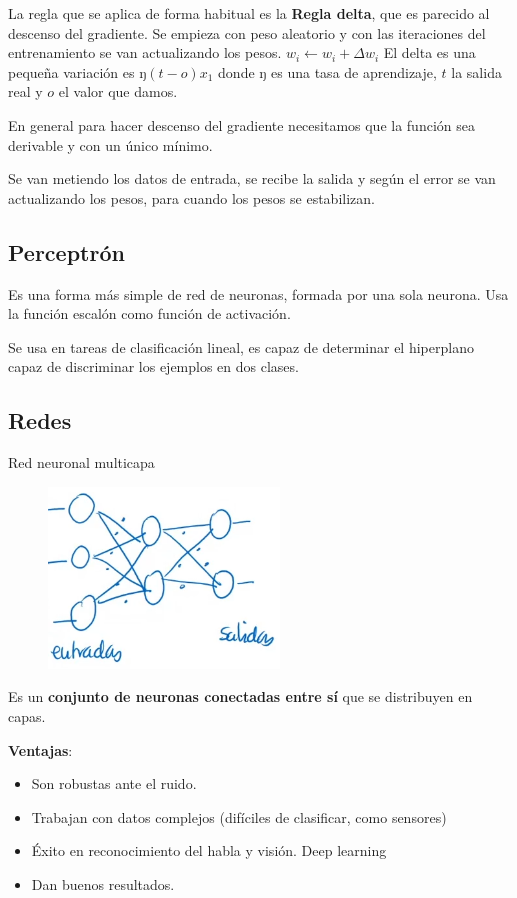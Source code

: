 \documentclass[12pt, twoside, openright]{report} %
\begin{document}
La regla que se aplica de forma habitual es la \textbf{Regla delta}, que
es parecido al descenso del gradiente. Se empieza con peso aleatorio y
con las iteraciones del entrenamiento se van actualizando los pesos.
\(w_i \leftarrow w_i+\Delta w_i\) El delta es una pequeña variación es
ŋ\((t-o)x_1\) donde ŋ es una tasa de aprendizaje, \(t\) la salida real y
\(o\) el valor que damos.

En general para hacer descenso del gradiente necesitamos que la función
sea derivable y con un único mínimo.

Se van metiendo los datos de entrada, se recibe la salida y según el error se van actualizando los pesos, para cuando los pesos se estabilizan.

\subsection{Perceptrón}

Es una forma más simple de red de neuronas, formada por una sola
neurona. Usa la función escalón como función de activación.

Se usa en tareas de clasificación lineal, es capaz de determinar el hiperplano capaz de discriminar los ejemplos en dos clases.

\subsection{Redes}

Red neuronal multicapa
\begin{figure}[H]
	{\includegraphics[scale=.82]{image-20210312102144206.png}}
\end{figure}
\vspace{-.5cm}
Es un \textbf{conjunto de neuronas conectadas entre sí} que se distribuyen en capas.

\textbf{Ventajas}:
\vspace{-.5cm}
\begin{itemize}
	\item Son robustas ante el ruido.
	\item Trabajan con datos complejos (difíciles de clasificar, como sensores)
	\item Éxito en reconocimiento del habla y visión. Deep learning
	\item Dan buenos resultados.
\end{itemize}
\end{document}
